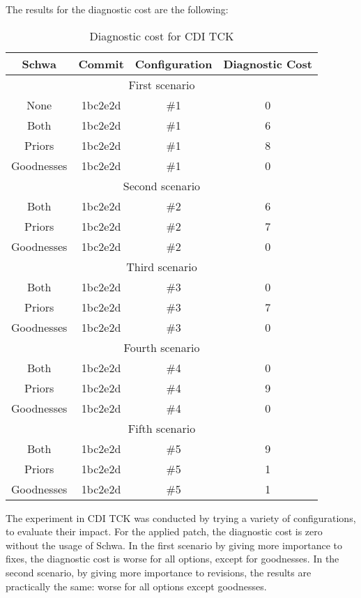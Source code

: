 The results for the diagnostic cost are the following:
\begin{table}[H]
    \centering
    \caption{Diagnostic cost for CDI TCK}
    \label{table:cd_cditck}
    \begin{tabular}{|c|c|c|c|}
        \hline
        Schwa & Commit & Configuration & Diagnostic Cost \\ \hline
        \multicolumn{4}{|c|}{First scenario} \\ \hline
        None & 1bc2e2d & \#1 & 0 \\ \hline
        Both & 1bc2e2d & \#1 & 6 \\ \hline
        Priors & 1bc2e2d & \#1 & 8 \\ \hline
        Goodnesses & 1bc2e2d & \#1 & 0 \\ \hline

        \multicolumn{4}{|c|}{Second scenario} \\ \hline
        Both & 1bc2e2d & \#2 & 6 \\ \hline
        Priors & 1bc2e2d & \#2 & 7 \\ \hline
        Goodnesses & 1bc2e2d & \#2 & 0 \\ \hline

        \multicolumn{4}{|c|}{Third scenario} \\ \hline
        Both & 1bc2e2d & \#3 & 0 \\ \hline
        Priors & 1bc2e2d & \#3 & 7 \\ \hline
        Goodnesses & 1bc2e2d & \#3 & 0 \\ \hline

        \multicolumn{4}{|c|}{Fourth scenario} \\ \hline
        Both & 1bc2e2d & \#4 & 0 \\ \hline
        Priors & 1bc2e2d & \#4 & 9 \\ \hline
        Goodnesses & 1bc2e2d & \#4 & 0 \\ \hline

        \multicolumn{4}{|c|}{Fifth scenario} \\ \hline
        Both & 1bc2e2d & \#5 & 9 \\ \hline
        Priors & 1bc2e2d & \#5 & 1 \\ \hline
        Goodnesses & 1bc2e2d & \#5 & 1 \\ \hline
    \end{tabular}
\end{table}

The experiment in CDI TCK was conducted by trying a variety of configurations,
to evaluate their impact. For the applied patch, the diagnostic cost is zero
without the usage of Schwa. In the first scenario by giving more importance to
fixes, the diagnostic cost is worse for all options, except for goodnesses. In
the second scenario, by giving more importance to revisions, the results are
practically the same: worse for all options except goodnesses.

